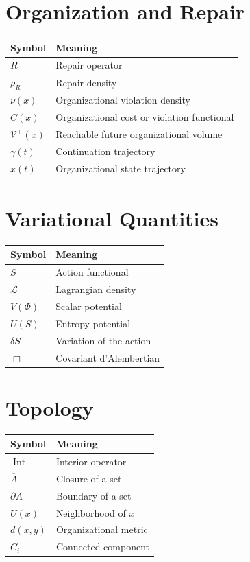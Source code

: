 \documentclass[11pt,oneside]{book}
\numberwithin{equation}{chapter}
\theoremstyle{definition}
\theoremstyle{plain}
\begin{document}
\section{Organization and Repair}

\begin{longtable}{ll}
\toprule
Symbol & Meaning\\
\midrule
$R$ & Repair operator\\
$\rho_R$ & Repair density\\
$\nu(x)$ & Organizational violation density\\
$C(x)$ & Organizational cost or violation functional\\
$\mathcal V^+(x)$ & Reachable future organizational volume\\
$\gamma(t)$ & Continuation trajectory\\
$x(t)$ & Organizational state trajectory\\
\bottomrule
\end{longtable}

\section{Variational Quantities}

\begin{longtable}{ll}
\toprule
Symbol & Meaning\\
\midrule
$S$ & Action functional\\
$\mathcal L$ & Lagrangian density\\
$V(\Phi)$ & Scalar potential\\
$U(S)$ & Entropy potential\\
$\delta S$ & Variation of the action\\
$\Box$ & Covariant d'Alembertian\\
\bottomrule
\end{longtable}

\section{Topology}

\begin{longtable}{ll}
\toprule
Symbol & Meaning\\
\midrule
$\operatorname{Int}$ & Interior operator\\
$\overline{A}$ & Closure of a set\\
$\partial A$ & Boundary of a set\\
$U(x)$ & Neighborhood of $x$\\
$d(x,y)$ & Organizational metric\\
$C_i$ & Connected component\\
\bottomrule
\end{longtable}
\end{document}
